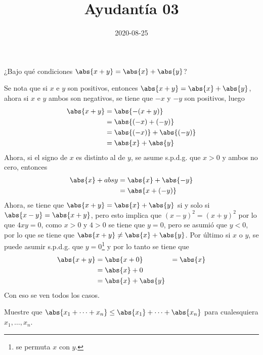 \documentclass{ayudantia}
\title{Ayudantía 03}
\date{2020-08-25}
\begin{document}
\maketitle

\begin{prob}
    ¿Bajo qué condiciones \(\abs{x+y}=\abs{x}+\abs{y}\)?
\end{prob}

\begin{ans}
    \begin{sol}
        Se nota que si \(x\) e \(y\) son positivos, entonces \(\abs{x+y}=\abs{x}+\abs{y}\), ahora si \(x\) e \(y\) ambos son negativos, se tiene que \(-x\) y \(-y\) son positivos, luego
        \begin{align*}
            \abs{x+y}&=\abs{-(x+y)}\\
            &=\abs{(-x)+(-y)}\\
            &=\abs{(-x)}+\abs{(-y)}\\
            &=\abs{x}+\abs{y}
        \end{align*}
        Ahora, si el signo de \(x\) es distinto al de \(y\), se asume s.p.d.g. que \(x>0\) y ambos no cero, entonces
        \begin{align*}
            \abs{x}+abs{y}&=\abs{x}+\abs{-y}\\
            &=\abs{x+(-y)}
        \end{align*}
        Ahora, se tiene que \(\abs{x+y}=\abs{x}+\abs{y}\) si y solo si \(\abs{x-y}=\abs{x+y}\), pero esto implica que \((x-y)^2=(x+y)^2\) por lo que \(4xy=0\), como \(x>0\) y \(4>0\) se tiene que \(y=0\), pero se asumió que \(y<0\), por lo que se tiene que \(\abs{x+y}\neq\abs{x}+\abs{y}\). Por último si \(x\) o \(y\), se puede asumir s.p.d.g. que \(y=0\)\footnote{se permuta \(x\) con \(y\).} y por lo tanto se tiene que
        \begin{align*}
            \abs{x+y}&=\abs{x+0}
            &=\abs{x}\\
            &=\abs{x}+0\\
            &=\abs{x}+\abs{y}\\
        \end{align*}
        Con eso se ven todos los casos.
    \end{sol}
\end{ans}


\begin{prob}
    Muestre que \(\abs{x_1+\dots+x_n}\leq\abs{x_1}+\dots+\abs{x_n}\) para cualesquiera \(x_1,\dots,x_n\).
\end{prob}
\end{document}
